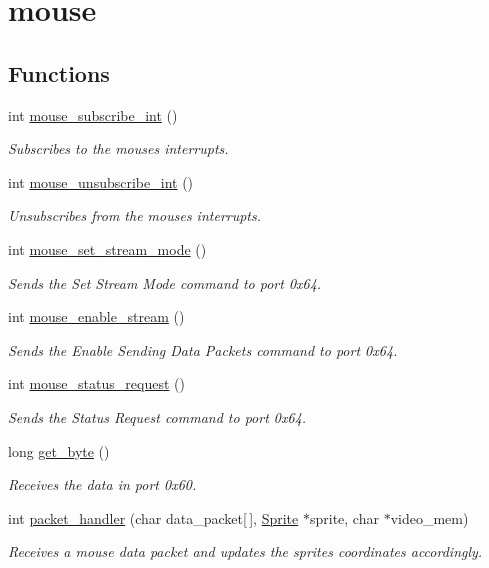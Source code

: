 \hypertarget{group__mouse}{}\section{mouse}
\label{group__mouse}
\subsection*{Functions}
\begin{DoxyCompactItemize}
\item 
int \hyperlink{group__mouse_ga99506573209b197b84ee22a228b89fbd}{mouse\+\_\+subscribe\+\_\+int} ()
\begin{DoxyCompactList}\small\item\em Subscribes to the mouse\textquotesingle{}s interrupts. \end{DoxyCompactList}\item 
int \hyperlink{group__mouse_ga685ad2706aca36d9869a30a19b9f446a}{mouse\+\_\+unsubscribe\+\_\+int} ()
\begin{DoxyCompactList}\small\item\em Unsubscribes from the mouse\textquotesingle{}s interrupts. \end{DoxyCompactList}\item 
int \hyperlink{group__mouse_ga16a521d1919cbd8f434d8b5d535a639b}{mouse\+\_\+set\+\_\+stream\+\_\+mode} ()
\begin{DoxyCompactList}\small\item\em Sends the Set Stream Mode command to port 0x64. \end{DoxyCompactList}\item 
int \hyperlink{group__mouse_ga6d00dfd9c62a4446f67caea39b64d463}{mouse\+\_\+enable\+\_\+stream} ()
\begin{DoxyCompactList}\small\item\em Sends the Enable Sending Data Packets command to port 0x64. \end{DoxyCompactList}\item 
int \hyperlink{group__mouse_gaff2fd99bd9285fa0fc166788f9cc7569}{mouse\+\_\+status\+\_\+request} ()
\begin{DoxyCompactList}\small\item\em Sends the Status Request command to port 0x64. \end{DoxyCompactList}\item 
long \hyperlink{group__mouse_ga59b282691a2a3edde462f7b36351a74a}{get\+\_\+byte} ()
\begin{DoxyCompactList}\small\item\em Receives the data in port 0x60. \end{DoxyCompactList}\item 
int \hyperlink{group__mouse_ga04bd9f2c1818e56a4604e290a068842b}{packet\+\_\+handler} (char data\+\_\+packet\mbox{[}$\,$\mbox{]}, \hyperlink{struct_sprite}{Sprite} $\ast$sprite, char $\ast$video\+\_\+mem)
\begin{DoxyCompactList}\small\item\em Receives a mouse data packet and updates the sprite\textquotesingle{}s coordinates accordingly. \end{DoxyCompactList}\end{DoxyCompactItemize}


